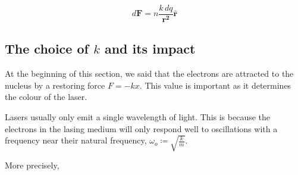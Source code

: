 \documentclass{article}
\begin{document}
\begin{equation}
    d\mathbf{F} = n\frac{k\,dq}{\mathbf{r^2}}\hat{\mathbf{r}}
\end{equation}

\subsection{The choice of $k$ and its impact}

At the beginning of this section, we said that the electrons are attracted to the nucleus by a restoring force $F = -kx$. This value is important as it determines the colour of the laser.

Lasers usually only emit a single wavelength of light. This is because the electrons in the lasing medium will only respond well to oscillations with a frequency near their natural frequency, $\omega_o \coloneq \sqrt{\frac{k}{m}}$.

More precisely, 
\end{document}
